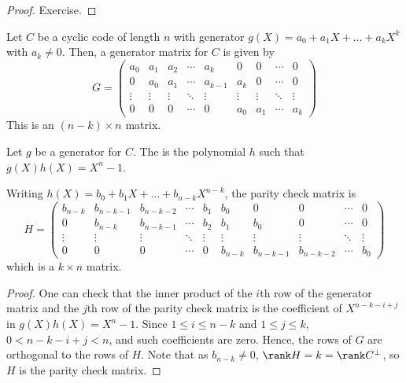 \begin{proof}
    Exercise.
\end{proof}
\begin{corollary}
    Let $C$ be a cyclic code of length $n$ with generator $g(X) = a_0 + a_1 X + \dots + a_k X^k$ with $a_k \neq 0$.
    Then, a generator matrix for $C$ is given by
    \[ G = \begin{pmatrix}
        a_0 & a_1 & a_2 & \cdots & a_k & 0 & 0 & \cdots & 0 \\
        0 & a_0 & a_1 & \cdots & a_{k-1} & a_k & 0 & \cdots & 0 \\
        \vdots & \vdots & \vdots & \ddots & \vdots & \vdots & \vdots & \ddots & \vdots \\
        0 & 0 & 0 & \cdots & 0 & a_0 & a_1 & \cdots & a_k
    \end{pmatrix} \]
    This is an $(n - k) \times n$ matrix.
\end{corollary}
\begin{definition}
    Let $g$ be a generator for $C$.
    The  is the polynomial $h$ such that $g(X) h(X) = X^n - 1$.
\end{definition}
\begin{corollary}
    Writing $h(X) = b_0 + b_1 X + \dots + b_{n-k} X^{n-k}$, the parity check matrix is
    \[ H = \begin{pmatrix}
        b_{n-k} & b_{n-k-1} & b_{n-k-2} & \cdots & b_1 & b_0 & 0 & 0 & \cdots & 0 \\
        0 & b_{n-k} & b_{n-k-1} & \cdots & b_2 & b_1 & b_0 & 0 & \cdots & 0 \\
        \vdots & \vdots & \vdots & \ddots & \vdots & \vdots & \vdots & \vdots & \ddots & \vdots \\
        0 & 0 & 0 & \cdots & 0 & b_{n-k} & b_{n-k-1} & b_{n-k-2} & \cdots & b_0
    \end{pmatrix} \]
    which is a $k \times n$ matrix.
\end{corollary}
\begin{proof}
    One can check that the inner product of the $i$th row of the generator matrix and the $j$th row of the parity check matrix is the coefficient of $X^{n-k-i+j}$ in $g(X) h(X) = X^n - 1$.
    Since $1 \leq i \leq n - k$ and $1 \leq j \leq k$, $0 < n - k - i + j < n$, and such coefficients are zero.
    Hence, the rows of $G$ are orthogonal to the rows of $H$.
    Note that as $b_{n-k} \neq 0$, $\rank H = k = \rank C^\perp$, so $H$ is the parity check matrix.
\end{proof}
